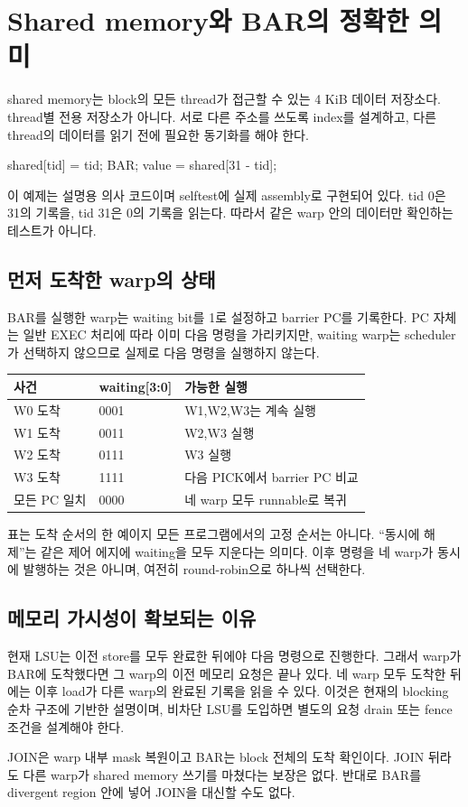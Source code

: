\documentclass[a4paper,11pt]{article}
\newcommand{\chapterpage}[1]{\clearpage\section{#1}}
\begin{document}
\chapterpage{Shared memory와 BAR의 정확한 의미}
shared memory는 block의 모든 thread가 접근할 수 있는 4 KiB 데이터 저장소다. thread별 전용 저장소가 아니다. 서로 다른 주소를 쓰도록 index를 설계하고, 다른 thread의 데이터를 읽기 전에 필요한 동기화를 해야 한다.
\begin{Code}
shared[tid] = tid;
BAR;
value = shared[31 - tid];
\end{Code}
이 예제는 설명용 의사 코드이며 selftest에 실제 assembly로 구현되어 있다. tid 0은 31의 기록을, tid 31은 0의 기록을 읽는다. 따라서 같은 warp 안의 데이터만 확인하는 테스트가 아니다.
\subsection{먼저 도착한 warp의 상태}
BAR를 실행한 warp는 waiting bit를 1로 설정하고 barrier PC를 기록한다. PC 자체는 일반 EXEC 처리에 따라 이미 다음 명령을 가리키지만, waiting warp는 scheduler가 선택하지 않으므로 실제로 다음 명령을 실행하지 않는다.
\par\medskip
\begin{tabularx}{\linewidth}{p{35mm}p{25mm}Y}
\toprule 사건 & waiting[3:0] & 가능한 실행 \\\midrule
W0 도착 & 0001 & W1,W2,W3는 계속 실행\\
W1 도착 & 0011 & W2,W3 실행\\
W2 도착 & 0111 & W3 실행\\
W3 도착 & 1111 & 다음 PICK에서 barrier PC 비교\\
모든 PC 일치 & 0000 & 네 warp 모두 runnable로 복귀\\
\bottomrule
\end{tabularx}
\par\medskip
표는 도착 순서의 한 예이지 모든 프로그램에서의 고정 순서는 아니다. ``동시에 해제''는 같은 제어 에지에 waiting을 모두 지운다는 의미다. 이후 명령을 네 warp가 동시에 발행하는 것은 아니며, 여전히 round-robin으로 하나씩 선택한다.
\subsection{메모리 가시성이 확보되는 이유}
현재 LSU는 이전 store를 모두 완료한 뒤에야 다음 명령으로 진행한다. 그래서 warp가 BAR에 도착했다면 그 warp의 이전 메모리 요청은 끝나 있다. 네 warp 모두 도착한 뒤에는 이후 load가 다른 warp의 완료된 기록을 읽을 수 있다. 이것은 현재의 blocking 순차 구조에 기반한 설명이며, 비차단 LSU를 도입하면 별도의 요청 drain 또는 fence 조건을 설계해야 한다.

JOIN은 warp 내부 mask 복원이고 BAR는 block 전체의 도착 확인이다. JOIN 뒤라도 다른 warp가 shared memory 쓰기를 마쳤다는 보장은 없다. 반대로 BAR를 divergent region 안에 넣어 JOIN을 대신할 수도 없다.
\end{document}
